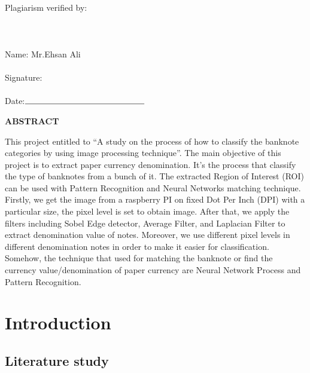 \documentclass[a4paper,12pt]{report}
\begin{document}
\indent \\ \\ \\ \\ \\ \\      \large Plagiarism verified by: \\ \\ \\ \\  \indent \hspace{205}  \large Name: Mr.Ehsan Ali \indent \\ \indent \hspace{205} \\ \indent \hspace{205}   Signature: \indent \\ \indent \\ \indent \hspace{205}  \large Date:$\rule{5cm}{0.15mm}$

\newpage
\begin{center}
	\textbf {\Large ABSTRACT}
\end{center}
\hspace{5} \large
This project entitled to “A study on the process of how to classify the banknote categories by using image processing technique”. The main objective of this project is to extract paper currency denomination. It’s the process that classify the type of banknotes from a bunch of it. The extracted Region of Interest (ROI) can be used with Pattern Recognition and Neural Networks matching technique. Firstly, we get the image from a raspberry PI on fixed Dot Per Inch (DPI) with a particular size, the pixel level is set to obtain image. After that, we apply the filters including Sobel Edge detector, Average Filter, and Laplacian Filter to extract denomination value of notes. Moreover, we use different pixel levels in different denomination notes in order to make it easier for classification. Somehow, the technique that used for matching the banknote or find the currency value/denomination of paper currency are Neural Network Process and Pattern Recognition.
\newpage
\tableofcontents 
\newpage
\chapter {Introduction}
\section{Literature study}
\end{document}
